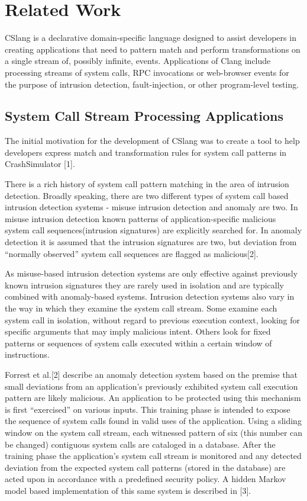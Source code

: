 \section{Related Work}
\label{SEC:related-work}

CSlang is a declarative domain-specific language designed to
assist developers in creating applications that need to pattern match and perform
transformations on a single stream of, possibly infinite, events. Applications
of Clang include processing streams of system calls, RPC invocations or
web-browser events for the purpose of intrusion detection, fault-injection, or
other program-level testing.

\subsection{System Call Stream Processing Applications}
The
initial motivation for the development of CSlang was to create a tool to help
developers express match and transformation rules for system call patterns in
CrashSimulator [1].

There is a rich history of system call pattern
matching in the area of intrusion detection.  Broadly speaking, there are two
different types of system call based intrusion detection systems - misuse
intrusion detection and anomaly are two. In misuse intrusion
detection known patterns of application-specific malicious system call
sequences(intrusion signatures) are explicitly searched for. In anomaly
detection it is assumed that the intrusion signatures are two, but deviation
from “normally observed” system call sequences are flagged as
malicious[2].

As misuse-based intrusion detection systems are only
effective against previously known intrusion signatures they are rarely used in
isolation and are typically combined with anomaly-based systems. Intrusion
detection systems also vary in the way in which they examine the system call
stream. Some examine each system call in isolation, without regard to previous
execution context, looking for specific arguments that may imply malicious
intent.  Others look for fixed patterns or sequences of system calls executed
within a certain window of instructions.

Forrest et al.[2] describe
an anomaly detection system based on the premise that small deviations from
an application's previously exhibited system call execution pattern are likely
malicious. An application to be protected using this mechanism is first
“exercised” on various inputs. This training phase is intended to expose the
sequence of system calls found in valid uses of the application. Using a sliding
window on the system call stream, each witnessed pattern of six (this number can
be changed) contiguous system calls are cataloged in a database. After the
training phase the application's system call stream is monitored and any detected
deviation from the expected system call patterns (stored in the database) are
acted upon in accordance with a predefined security policy. A hidden Markov model
based implementation of this same system is described in [3].

